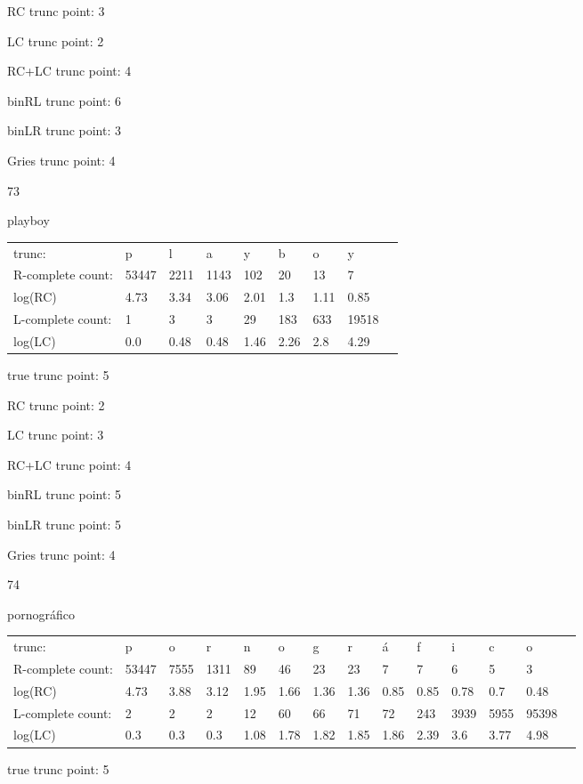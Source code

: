 \documentclass[10pt]{article}
\begin{document}
RC trunc point: 3

LC trunc point: 2

RC+LC trunc point: 4

binRL trunc point: 6

binLR trunc point: 3

Gries trunc point: 4

\newpage

73

playboy

\begin{tabular}{l|llllllll}
trunc: & p & l & a & y & b & o & y & \\ 
R-complete count: & 53447 & 2211 & 1143 & 102 & 20 & 13 & 7 & \\ 
log(RC) & 4.73 & 3.34 & 3.06 & 2.01 & 1.3 & 1.11 & 0.85 & \\ 
L-complete count: & 1 & 3 & 3 & 29 & 183 & 633 & 19518 & \\ 
log(LC) & 0.0 & 0.48 & 0.48 & 1.46 & 2.26 & 2.8 & 4.29 & \\ 
\end{tabular}

true trunc point: 5

RC trunc point: 2

LC trunc point: 3

RC+LC trunc point: 4

binRL trunc point: 5

binLR trunc point: 5

Gries trunc point: 4

\vspace{1em}

74

pornográfico

\begin{tabular}{l|lllllllllllll}
trunc: & p & o & r & n & o & g & r & á & f & i & c & o & \\ 
R-complete count: & 53447 & 7555 & 1311 & 89 & 46 & 23 & 23 & 7 & 7 & 6 & 5 & 3 & \\ 
log(RC) & 4.73 & 3.88 & 3.12 & 1.95 & 1.66 & 1.36 & 1.36 & 0.85 & 0.85 & 0.78 & 0.7 & 0.48 & \\ 
L-complete count: & 2 & 2 & 2 & 12 & 60 & 66 & 71 & 72 & 243 & 3939 & 5955 & 95398 & \\ 
log(LC) & 0.3 & 0.3 & 0.3 & 1.08 & 1.78 & 1.82 & 1.85 & 1.86 & 2.39 & 3.6 & 3.77 & 4.98 & \\ 
\end{tabular}

true trunc point: 5
\end{document}
